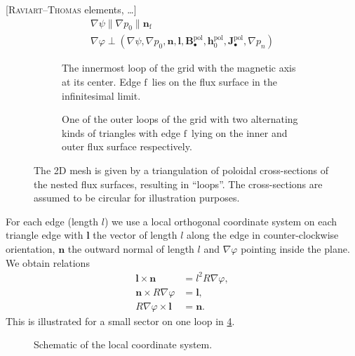 \documentclass[a4paper, twoside, 10pt, english]{article}
\numberwithin{equation}{section}
\let\temp\varrho
\let\varrho\rho
\let\rho\temp
\let\temp\vartheta
\let\vartheta\theta
\let\theta\temp
\let\temp\varphi
\let\varphi\phi
\let\phi\temp
\let\vec\symbf
\newcommand*\grad{\ensuremath{\nabla}}
\newcommand*\pol{\ensuremath{\textrm{pol}}}  %
\newcommand*\fs{\ensuremath{\textrm{f}}}  %
\begin{document}
[\textsc{Raviart}--\textsc{Thomas} elements, \ldots]
\begin{gather*}
  \grad \psi \parallel \grad p_{0} \parallel \vec{n}_{\fs} \\
  \grad \phi \perp \left( \grad \psi, \grad p_{0}, \vec{n}, \vec{l}, \vec{B}_{\bullet}^{\pol}, \vec{h}_{0}^{\pol}, \vec{J}_{\bullet}^{\pol}, \grad p_{n} \right)
\end{gather*}

\begin{figure}[bth]
  \centering
  \begin{subfigure}[b]{0.33\textwidth}
    \centering
    
    \caption{The innermost loop of the grid with the magnetic axis at its center. Edge \fs\ lies on the flux surface in the infinitesimal limit.}
    \label{fig:grid0}
  \end{subfigure}
  \quad
  \begin{subfigure}[b]{0.5\textwidth}
    \centering
    
    \caption{One of the outer loops of the grid with two alternating kinds of triangles with edge \fs\ lying on the inner and outer flux surface respectively.}
    \label{fig:grid1}
  \end{subfigure}
  \caption{The 2D mesh is given by a triangulation of poloidal cross-sections of the nested flux surfaces, resulting in \enquote{loops}. The cross-sections are assumed to be circular for illustration purposes.}
  \label{fig:grid}
\end{figure}

For each edge (length $l$) we use a local orthogonal coordinate system on each triangle edge with $\vec{l}$ the vector of length $l$ along the edge in counter-clockwise orientation, $\vec{n}$ the outward normal of length $l$ and $\grad \phi$ pointing inside the plane. We obtain relations
\begin{align}
  \vec{l} \times \vec{n} &= l^{2} R \grad \phi, \\
  \vec{n} \times R \grad \phi &= \vec{l}, \\
  R \grad \phi \times \vec{l} &= \vec{n}.
\end{align}
This is illustrated for a small sector on one loop in \cref{fig:local_coordinates}.

\begin{figure}[bth]
  \centering
  
  \caption{Schematic of the local coordinate system.}
  \label{fig:local_coordinates}
\end{figure}

\clearpage
\end{document}
